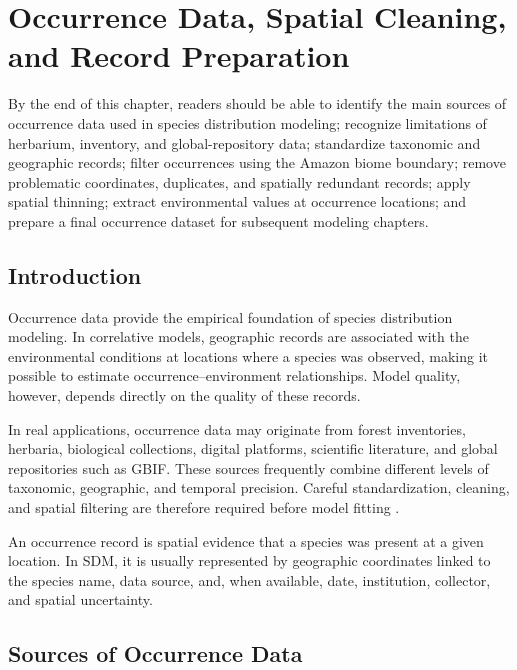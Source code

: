 \chapter[Occurrence Data]{Occurrence Data, Spatial Cleaning, and Record Preparation}

\begin{objetivos}
By the end of this chapter, readers should be able to identify the main sources
of occurrence data used in species distribution modeling; recognize limitations
of herbarium, inventory, and global-repository data; standardize taxonomic and
geographic records; filter occurrences using the Amazon biome boundary; remove
problematic coordinates, duplicates, and spatially redundant records; apply
spatial thinning; extract environmental values at occurrence locations; and
prepare a final occurrence dataset for subsequent modeling chapters.
\end{objetivos}

\section{Introduction}

Occurrence data provide the empirical foundation of species distribution
modeling. In correlative models, geographic records are associated with the
environmental conditions at locations where a species was observed, making it
possible to estimate occurrence--environment relationships. Model quality,
however, depends directly on the quality of these records.

In real applications, occurrence data may originate from forest inventories,
herbaria, biological collections, digital platforms, scientific literature,
and global repositories such as GBIF. These sources frequently combine
different levels of taxonomic, geographic, and temporal precision. Careful
standardization, cleaning, and spatial filtering are therefore required before
model fitting \parencite{guisan2017habitat,hijmans2021species,zizka2019coordinatecleaner}.

\begin{conceito}[title={\faBook\quad Occurrence record}]
An occurrence record is spatial evidence that a species was present at a given
location. In SDM, it is usually represented by geographic coordinates linked to
the species name, data source, and, when available, date, institution,
collector, and spatial uncertainty.
\end{conceito}

\section{Sources of Occurrence Data}

